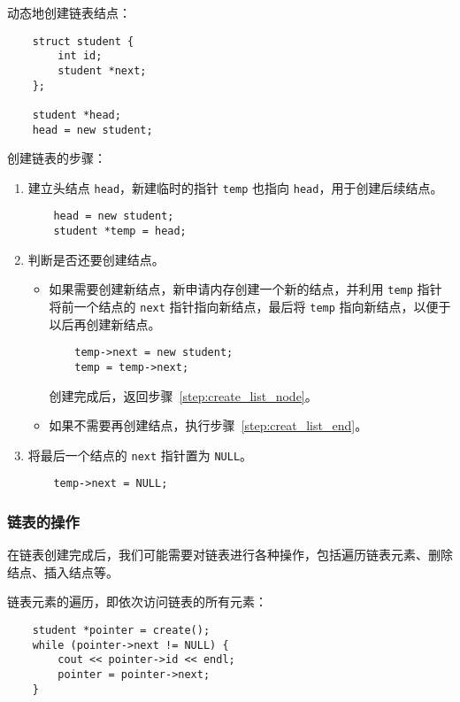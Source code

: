 \documentclass[UTF8]{ctexart}
\begin{document}
\pagebreak[6]
动态地创建链表结点：
\begin{verbatim}
    struct student {
        int id;
        student *next;
    };

    student *head;
    head = new student;
\end{verbatim}

创建链表的步骤：
\begin{enumerate}
    \item 建立头结点 \texttt{head}，新建临时的指针 \texttt{temp} 也指向 \texttt{head}，用于创建后续结点。
    \begin{verbatim}
    head = new student;
    student *temp = head;
    \end{verbatim}
    \item 判断是否还要创建结点。
    \begin{itemize} \label{step:create_list_node}
        \item 如果需要创建新结点，新申请内存创建一个新的结点，并利用 \texttt{temp} 指针将前一个结点的
        \texttt{next} 指针指向新结点，最后将 \texttt{temp} 指向新结点，以便于以后再创建新结点。
    \begin{verbatim}
    temp->next = new student;
    temp = temp->next;
    \end{verbatim}
        创建完成后，返回步骤~\ref{step:create_list_node}。

        \item 如果不需要再创建结点，执行步骤~\ref{step:creat_list_end}。
    \end{itemize}
    \item \label{step:creat_list_end} 将最后一个结点的 \texttt{next} 指针置为 \texttt{NULL}。
    \begin{verbatim}
    temp->next = NULL;
    \end{verbatim}
\end{enumerate}

\subsubsection{链表的操作}
在链表创建完成后，我们可能需要对链表进行各种操作，包括遍历链表元素、删除结点、插入结点等。

链表元素的遍历，即依次访问链表的所有元素：
\begin{verbatim}
    student *pointer = create();
    while (pointer->next != NULL) {
        cout << pointer->id << endl;
        pointer = pointer->next;
    }
\end{verbatim}
\end{document}
